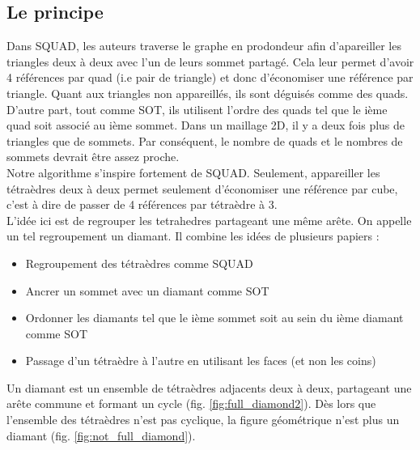 \documentclass[a4paper,11pt,openany]{article}
\begin{document}
\subsection{Le principe}
\noindent
Dans SQUAD, les auteurs traverse le graphe en prodondeur afin d'apareiller les triangles deux à deux avec l'un de leurs sommet partagé. Cela leur permet d'avoir 4 références par quad (i.e pair de triangle) et donc d'économiser une référence par triangle. Quant aux triangles non appareillés, ils sont déguisés comme des quads. D'autre part, tout comme SOT, ils utilisent l'ordre des quads tel que le ième quad soit associé au ième sommet. Dans un maillage 2D, il y a deux fois plus de triangles que de sommets. Par conséquent, le nombre de quads et le nombres de sommets devrait être assez proche.\\
Notre algorithme s'inspire fortement de SQUAD. Seulement, appareiller les tétraèdres deux à deux permet seulement d'économiser une référence par cube, c'est à dire de passer de 4 références par tétraèdre à 3.\\
L'idée ici est de regrouper les tetrahedres partageant une même arête. On appelle un tel regroupement un diamant. Il combine les idées de plusieurs papiers :
\begin{itemize}
\item Regroupement des tétraèdres comme SQUAD
\item Ancrer un sommet avec un diamant comme SOT
\item Ordonner les diamants tel que le ième sommet soit au sein du ième diamant comme SOT
\item Passage d'un tétraèdre à l'autre en utilisant les faces (et non les coins)
\end{itemize}
Un diamant est un ensemble de tétraèdres adjacents deux à deux, partageant une arête commune et formant un cycle (fig. \ref{fig:full_diamond2}). Dès lors que l'ensemble des tétraèdres n'est pas cyclique, la figure géométrique n'est plus un diamant (fig. \ref{fig:not_full_diamond}). 
\end{document}
